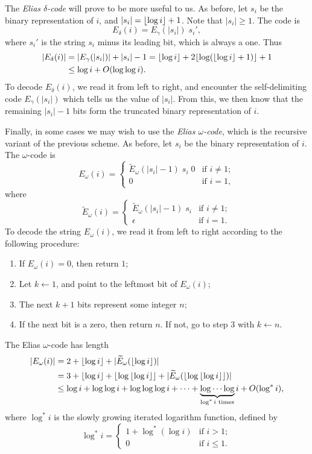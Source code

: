 The \emph{Elias $\delta$-code} will prove to be more useful to us. As
before, let $s_i$ be the binary representation of $i$, and
$|s_i| = {\lfloor \log i \rfloor} + 1$. Note that $|s_i| \geq 1$. The code is
\[E_\delta(i) = E_\gamma(|s_i|) \; s_i',\]
where $s_i'$ is the string $s_i$ minus its leading bit, which is
always a one. Thus
\begin{align*}
  |{E_\delta}(i)| & = |{E_\gamma}(|s_i|)| + |s_i| - 1 = {\lfloor \log i \rfloor} + 2
                  {\lfloor \log ({\lfloor \log i \rfloor} + 1) \rfloor} + 1 \\
                & \leq \log i + O(\log \log i).
\end{align*}
To decode $E_\delta(i)$, we read it from left to right, and encounter
the self-delimiting code $E_\gamma(|s_i|)$ which tells us the value of
$|s_i|$. From this, we then know that the remaining $|s_i| - 1$ bits
form the truncated binary representation of $i$.

Finally, in some cases we may wish to use the \emph{Elias
  $\omega$-code}, which is the recursive variant of the previous
scheme. As before, let $s_i$ be the binary representation of $i$. The
$\omega$-code is
\[
E_\omega(i) = \left\{
  \begin{array}{ll}
    \widetilde{E}_\omega(|s_i| - 1) \; s_i \; 0 & \mbox{if $i \neq 1$};\\
    0 & \mbox{if $i = 1$},
  \end{array} \right.
\]
where
\[
\widetilde{E}_\omega(i) = \left\{
  \begin{array}{ll}
    \widetilde{E}_\omega(|s_i| - 1) \; s_i & \mbox{if $i \neq 1$};\\
    \epsilon & \mbox{if $i = 1$}.
  \end{array} \right.
\]
To decode the string $E_\omega(i)$, we read it from left to right
according to the following procedure:
\begin{enumerate}
\item If $E_\omega(i) = 0$, then return $1$;
\item Let $k \leftarrow 1$, and point to the leftmost bit of
  $E_\omega(i)$;
\item The next $k + 1$ bits represent some integer $n$;
\item If the next bit is a zero, then return $n$. If not, go to step 3
  with $k \leftarrow n$.
\end{enumerate}
The Elias $\omega$-code has length
\begin{align*}
  |E_\omega(i)| & = 2 + {\lfloor \log i \rfloor} + |\widetilde{E}_\omega({\lfloor \log i \rfloor})| \\
                & = 3 + {\lfloor \log i \rfloor} + {\lfloor \log {\lfloor \log i \rfloor} \rfloor} + |\widetilde{E}_\omega({\lfloor \log {\lfloor \log i \rfloor} \rfloor})| \\
                & \leq \log i + \log \log i + \log \log \log i + \cdots + \underbrace{\log \cdots \log}_{\text{$\log^* i$ times}} i + O(\log^* i),
\end{align*}
where $\log^* i$ is the slowly growing iterated logarithm function,
defined by
\[
\log^* i = \left\{
  \begin{array}{ll}
    1 + \log^*(\log i) & \mbox{if $i > 1$};\\
    0 & \mbox{if $i \leq 1$}.
  \end{array} \right.
\]

